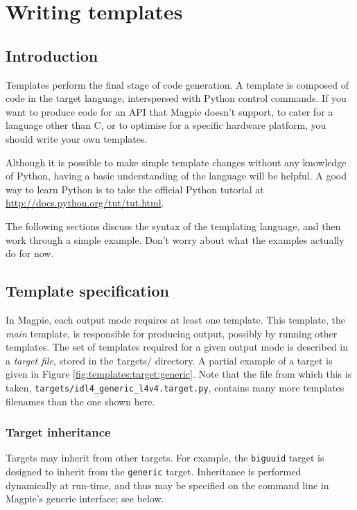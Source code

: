 \chapter{Writing templates}
\label{chapter:templating}
\section{Introduction}
Templates perform the final stage of code generation. A template is composed of code in the target language, interspersed with Python control commands. If you want to produce code for an API that Magpie doesn't support, to cater for a language other than C, or to optimise for a specific hardware platform, you should write your own templates.

Although it is possible to make simple template changes without any knowledge of Python, having a basic understanding of the language will be helpful. A good way to learn Python is to take the official Python tutorial at \url{http://docs.python.org/tut/tut.html}.

The following sections discuss the syntax of the templating language, and then work through a simple example. Don't worry about what the examples actually do for now.

\section{Template specification}
In Magpie, each output mode requires at least one template. This template, the {\em main} template, is responsible for producing output, possibly by running other templates. The set of templates required for a given output mode is described in a {\em target file}, stored in the {\texttt targets/} directory. A partial example of a target is given in Figure \ref{fig:templates:target:generic}. Note that the file from which this is taken, {\tt targets/idl4\_generic\_l4v4.target.py}, contains many more templates filenames than the one shown here.

\subsection{Target inheritance}
\label{templating:intro:inheritance}
Targets may inherit from other targets. For example, the {\tt biguuid} target is designed to inherit from the {\tt generic} target. Inheritance is performed dynamically at run-time, and thus may be specified on the command line in Magpie's generic interface; see below.

